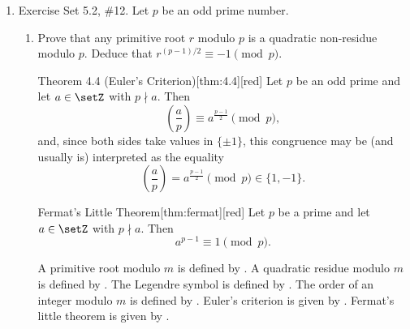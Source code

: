 \begin{enumerate}
\begin{subanswer}
    Computing these values:
    \begin{align*}
      2^6 &= 64 \equiv 3 \pmod{61},\\
      2^{18} &= (2^6)^3 \equiv 3^3 = 27 \pmod{61},\\
      2^{42} &= 2^{60-18} \equiv 2^{-18} \equiv (2^{18})^{-1} \equiv 27^{-1} \pmod{61},\\
      2^{54} &= 2^{60-6} \equiv 2^{-6} \equiv (2^6)^{-1} \equiv 3^{-1} \pmod{61}.
    \end{align*}
    To find $27^{-1} \pmod{61}$, the extended Euclidean algorithm is used.
    Since $61 = 27 \cdot 2 + 7$, $27 = 7 \cdot 3 + 6$, and $7 = 6 \cdot 1 + 1$, working backwards:
    \[
    1 = 7 - 6 = 7 - (27 - 7 \cdot 3) = 7 \cdot 4 - 27 = (61 - 27 \cdot 2) \cdot 4 - 27 = 61 \cdot 4 - 27 \cdot 9.
    \]
    Therefore, $27 \cdot (-9) \equiv 1 \pmod{61}$, so $27^{-1} \equiv -9 \equiv 52 \pmod{61}$.
    Hence, $2^{42} \equiv 52 \pmod{61}$.
    
    To find $3^{-1} \pmod{61}$, since $61 = 3 \cdot 20 + 1$, it follows that $1 = 61 - 3 \cdot 20$, so $3 \cdot (-20) \equiv 1 \pmod{61}$.
    Therefore, $3^{-1} \equiv -20 \equiv 41 \pmod{61}$.
    Hence, $2^{54} \equiv 41 \pmod{61}$.
    
    Therefore, all incongruent integers having order $10$ modulo $61$ are $3, 27, 52, 41 \pmod{61}$.
  \end{subanswer}






  \newpage
  \item Exercise Set 5.2, \#12. Let $p$ be an odd prime number.
  \begin{enumerate}
    \item Prove that any primitive root $r$ modulo $p$ is a quadratic non-residue modulo $p$. 
    Deduce that $r^{(p-1)/2} \equiv -1 \pmod{p}$.
    \begin{define}{Theorem 4.4 (Euler's Criterion)}[thm:4.4][red]
      Let $p$ be an odd prime and let $a\in\setZ$ with $p\nmid a$. Then
      \[
      \left(\frac{a}{p}\right) \equiv a^{\frac{p-1}{2}} \pmod p,
      \]
      and, since both sides take values in $\{\pm1\}$, this congruence may be (and usually is) interpreted as the equality
      \[
      \left(\frac{a}{p}\right) = a^{\frac{p-1}{2}} \pmod p \in\{1,-1\}.
      \]
    \end{define}
    \begin{define}{Fermat's Little Theorem}[thm:fermat][red]
      Let $p$ be a prime and let $a\in\setZ$ with $p\nmid a$. Then
      \[
      a^{p-1}\equiv 1 \pmod{p}.
      \]
    \end{define}
    \begin{subprove}
      A primitive root modulo $m$ is defined by .
      A quadratic residue modulo $m$ is defined by .
      The Legendre symbol is defined by .
      The order of an integer modulo $m$ is defined by .
      Euler's criterion is given by .
      Fermat's little theorem is given by .
      

\end{subprove}
\end{enumerate}
\end{enumerate}
